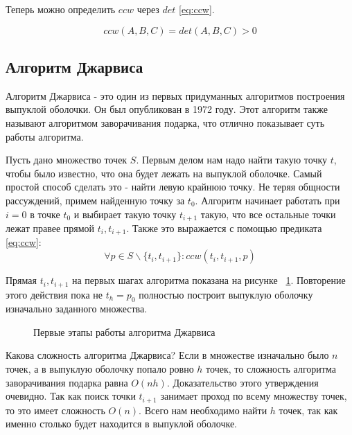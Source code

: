 Теперь можно определить $ccw$ через $det$ \eqref{eq:ccw}.

\begin{equation}\label{eq:ccw}
ccw(A, B, C)=det(A, B, C) > 0
\end{equation}


\subsection{Алгоритм Джарвиса} \label{subsect1_1_1}

Алгоритм Джарвиса - это один из первых придуманных алгоритмов построения выпуклой оболочки. Он был опубликован в 1972 году. %
Этот алгоритм также называют алгоритмом заворачивания подарка, что отлично показывает суть работы алгоритма.

Пусть дано множество точек $S$. Первым делом нам надо найти такую точку $t$, чтобы было известно, что она будет лежать на выпуклой оболочке. Самый простой способ сделать это - найти левую крайнюю точку. Не теряя общности рассуждений, примем найденную точку за $t_0$. Алгоритм начинает работать при $i=0$ в точке $t_0$ и выбирает такую точку $t_{i+1}$ такую, что все остальные точки лежат правее прямой $t_i, t_{i+1}$. Также это выражается с помощью предиката \eqref{eq:ccw}:
\[
\forall p \in S \backslash \{t_i, t_{i+1}\} : ccw(t_i, t_{i+1}, p)
\]

Прямая $t_i, t_{i+1}$ на первых шагах алгоритма показана на рисунке ~\ref{img:jarvis}. Повторение этого действия пока не $t_h=p_0$ полностью построит выпуклую оболочку изначально заданного множества.

\begin{figure}[H]
    {\centering
        \hfill
        \subbottom[\label{img:jarvis_1}]{%
            }
        \hfill
        \subbottom[\label{img:jarvis_2}]{%
            }
        \hfill
    }
    \caption{Первые этапы работы алгоритма Джарвиса}
    \label{img:jarvis}
\end{figure}

Какова сложность алгоритма Джарвиса? Если в множестве изначально было $n$ точек, а в выпуклую оболочку попало ровно $h$ точек, то сложность алгоритма заворачивания подарка равна $O(nh)$. Доказательство этого утверждения очевидно. Так как поиск точки $t_{i+1}$ занимает проход по всему множеству точек, то это имеет сложность $O(n)$. Всего нам необходимо найти $h$ точек, так как именно столько будет находится в выпуклой оболочке.

